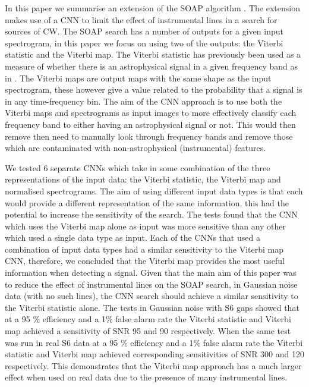 %
In this paper we summarise an extension of the SOAP algorithm \citep{bayley2019SOAPGeneralised}.
The extension makes use of a \gls{CNN} to limit the effect of
instrumental lines in a search for sources of \gls{CW}. 
The SOAP search has a number of outputs for a given input
spectrogram, in this paper we focus on using two of the outputs: the Viterbi statistic and the Viterbi map.
The Viterbi statistic has previously been used as a
measure of whether there is an astrophysical signal in a given frequency band as in \citep{bayley2019SOAPGeneralised}.
The Viterbi maps are output maps with the same shape as the input
spectrogram, these however give a value related to the probability that a signal is in any time-frequency bin. 
The aim of the \gls{CNN} approach is to use
both the Viterbi maps and spectrograms as input images to more effectively classify each
frequency band to either having an astrophysical signal or
not. This would then remove then need to manually look through frequency bands
and remove those which are contaminated with non-astrophysical (instrumental)
features. 

%
We tested 6 separate \glspl{CNN} which take in some combination of the three representations of the input data: the Viterbi statistic, the Viterbi map and normalised spectrograms. 
The aim of using different input data types is that each would
provide a different representation of the same information, this had
the potential to increase the sensitivity of the search. The tests found
that the \gls{CNN} which uses the Viterbi map alone as input was more sensitive
than any other which used a single data type as input. Each of the \glspl{CNN}
that used a combination of input data types had a similar sensitivity to the
Viterbi map \gls{CNN}, therefore, we concluded that the Viterbi map provides the most
useful information when detecting a signal.  Given that the main aim of this
paper was to reduce the effect of instrumental lines on the SOAP search, in
Gaussian noise data (with no such lines), the \gls{CNN} search should achieve a
similar sensitivity to the Viterbi statistic alone. The tests in Gaussian noise
with S6 gaps showed that at a 95 \% efficiency and a 1\% false alarm rate the
Viterbi statistic and Viterbi map achieved a sensitivity of SNR 95 and 90
respectively. When the same test was run in real S6 data at a 95 \% efficiency
and a 1\% false alarm rate the Viterbi statistic and Viterbi map achieved
corresponding sensitivities of SNR 300 and 120 respectively. This demonstrates
that the Viterbi map approach has a much larger effect when used on real data
due to the presence of many instrumental lines. 

